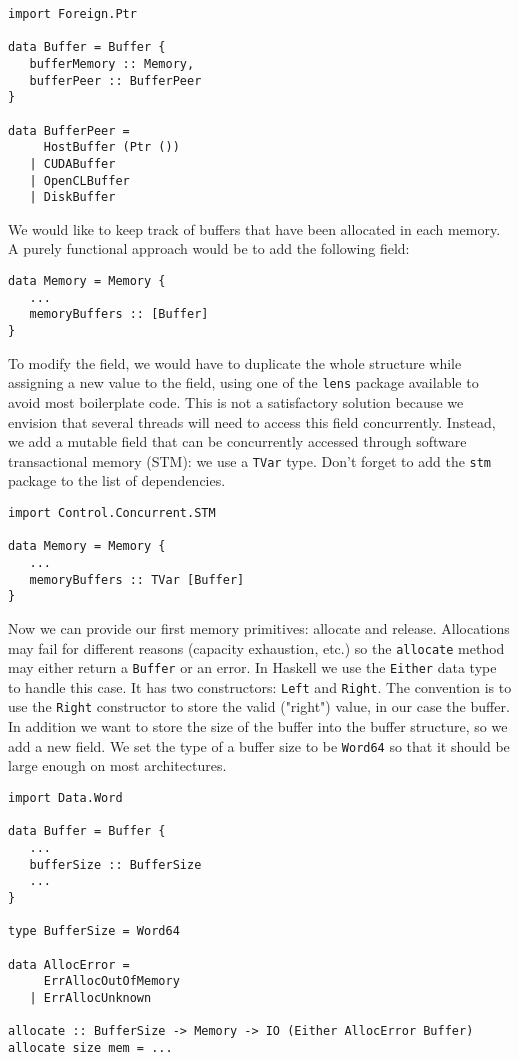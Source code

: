 \begin{lstlisting}
import Foreign.Ptr

data Buffer = Buffer {
   bufferMemory :: Memory,
   bufferPeer :: BufferPeer
}

data BufferPeer = 
     HostBuffer (Ptr ())
   | CUDABuffer
   | OpenCLBuffer
   | DiskBuffer
\end{lstlisting}

We would like to keep track of buffers that have been allocated in each memory.
A purely functional approach would be to add the following field:
\begin{lstlisting}
data Memory = Memory {
   ...
   memoryBuffers :: [Buffer]
}
\end{lstlisting}

To modify the field, we would have to duplicate the whole structure while
assigning a new value to the field, using one of the \texttt{lens} package
available to avoid most boilerplate code. This is not a satisfactory solution
because we envision that several threads will need to access this field
concurrently.  Instead, we add a mutable field that can be concurrently accessed
through software transactional memory (STM): we use a \texttt{TVar} type. Don't
forget to add the \texttt{stm} package to the list of dependencies.

\begin{lstlisting}
import Control.Concurrent.STM

data Memory = Memory {
   ...
   memoryBuffers :: TVar [Buffer]
}
\end{lstlisting}

Now we can provide our first memory primitives: allocate and release.
Allocations may fail for different reasons (capacity exhaustion, etc.) so the
\texttt{allocate} method may either return a \texttt{Buffer} or an error. In
Haskell we use the \texttt{Either} data type to handle this case. It has two
constructors: \texttt{Left} and \texttt{Right}. The convention is to use the
\texttt{Right} constructor to store the valid ("right") value, in our case the
buffer. In addition we want to store the size of the buffer into the buffer
structure, so we add a new field. We set the type of a buffer size to be
\texttt{Word64} so that it should be large enough on most architectures.


\begin{lstlisting}
import Data.Word

data Buffer = Buffer {
   ...
   bufferSize :: BufferSize
   ...
}

type BufferSize = Word64

data AllocError = 
     ErrAllocOutOfMemory
   | ErrAllocUnknown

allocate :: BufferSize -> Memory -> IO (Either AllocError Buffer)
allocate size mem = ...
\end{lstlisting}


